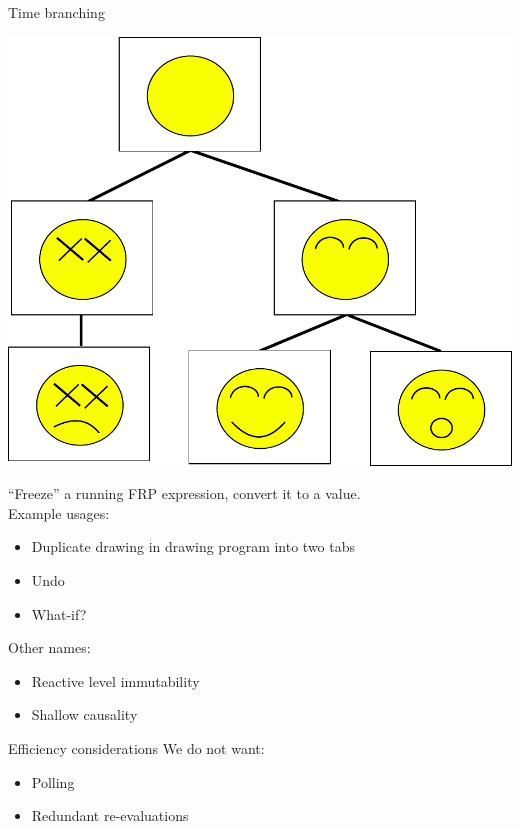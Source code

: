 \documentclass{beamer}
\begin{document}
\begin{frame}{Time branching}
\vspace{-0.2cm}
\begin{center}
\includegraphics[scale=0.3]{drawing.pdf}\\
\end{center}
\vspace{-0.2cm}
\noindent``Freeze'' a running FRP expression, convert it to a value.\\

Example usages:
\begin{itemize}
\item Duplicate drawing in drawing program into two tabs
\item Undo
\item What-if?
\end{itemize}

Other names:
\begin{itemize}
\item Reactive level immutability
\item Shallow causality
\end{itemize}

\end{frame}

\begin{frame}{Efficiency considerations}
We do not want:
\begin{itemize}
\item Polling
\item Redundant re-evaluations
\end{itemize}

\end{frame}
\end{document}
